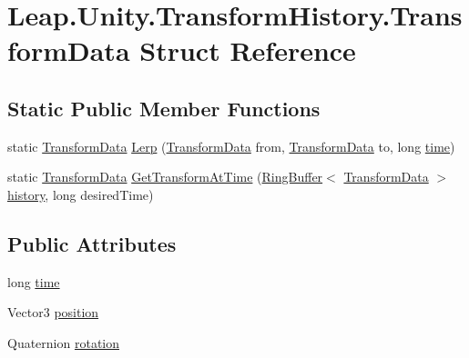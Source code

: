 \hypertarget{struct_leap_1_1_unity_1_1_transform_history_1_1_transform_data}{}\section{Leap.\+Unity.\+Transform\+History.\+Transform\+Data Struct Reference}
\label{struct_leap_1_1_unity_1_1_transform_history_1_1_transform_data}
\subsection*{Static Public Member Functions}
\begin{DoxyCompactItemize}
\item 
static \mbox{\hyperlink{struct_leap_1_1_unity_1_1_transform_history_1_1_transform_data}{Transform\+Data}} \mbox{\hyperlink{struct_leap_1_1_unity_1_1_transform_history_1_1_transform_data_adb76fa1aeb96a2febd96463d984fbeb1}{Lerp}} (\mbox{\hyperlink{struct_leap_1_1_unity_1_1_transform_history_1_1_transform_data}{Transform\+Data}} from, \mbox{\hyperlink{struct_leap_1_1_unity_1_1_transform_history_1_1_transform_data}{Transform\+Data}} to, long \mbox{\hyperlink{struct_leap_1_1_unity_1_1_transform_history_1_1_transform_data_aa34ce37b52533024f62c484923bbf17f}{time}})
\item 
static \mbox{\hyperlink{struct_leap_1_1_unity_1_1_transform_history_1_1_transform_data}{Transform\+Data}} \mbox{\hyperlink{struct_leap_1_1_unity_1_1_transform_history_1_1_transform_data_add53e4e63a0215262a28e9bea8a501cf}{Get\+Transform\+At\+Time}} (\mbox{\hyperlink{class_leap_1_1_unity_1_1_ring_buffer}{Ring\+Buffer}}$<$ \mbox{\hyperlink{struct_leap_1_1_unity_1_1_transform_history_1_1_transform_data}{Transform\+Data}} $>$ \mbox{\hyperlink{class_leap_1_1_unity_1_1_transform_history_a5d822021ea5550a45bd559d7567ae2ed}{history}}, long desired\+Time)
\end{DoxyCompactItemize}
\subsection*{Public Attributes}
\begin{DoxyCompactItemize}
\item 
long \mbox{\hyperlink{struct_leap_1_1_unity_1_1_transform_history_1_1_transform_data_aa34ce37b52533024f62c484923bbf17f}{time}}
\item 
Vector3 \mbox{\hyperlink{struct_leap_1_1_unity_1_1_transform_history_1_1_transform_data_a0205942fe8f0a6f48a927affe6717941}{position}}
\item 
Quaternion \mbox{\hyperlink{struct_leap_1_1_unity_1_1_transform_history_1_1_transform_data_a0c3da041f6f2c8bd7a4fd72b77b22898}{rotation}}
\end{DoxyCompactItemize}


